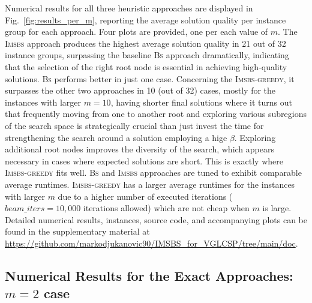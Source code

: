 \documentclass[runningheads]{llncs}
\begin{document}
  
  Numerical results for all three heuristic approaches are displayed in Fig.~\ref{fig:results_per_m}, reporting the average solution quality per instance group for each approach. Four plots are provided, one per each value of $m$. %
   The \textsc{Imsbs} approach produces the highest average solution quality in 21 out of 32 instance groups, surpassing the baseline \textsc{Bs} approach dramatically, indicating that the selection of the right root node is essential in achieving high-quality solutions.   \textsc{Bs} performs better in just one case. Concerning the \textsc{Imsbs-greedy}, it surpasses the other two approaches in 10 (out of 32) cases, mostly for the instances with larger $m=10$, having shorter final solutions where it turns out that frequently moving from one to another root and exploring various subregions of the search space is strategically crucial than just invest the time for strengthening the search around a solution employing a hige $\beta$.  Exploring additional root nodes improves the diversity of the search, which appears necessary in cases where expected solutions are short. This is exactly where  \textsc{Imsbs-greedy} fits well. 
\textsc{Bs} and \textsc{Imsbs} approaches are tuned to exhibit comparable average runtimes.  \textsc{Imsbs-greedy} has a larger average runtimes for the instances with larger $m$ due to a higher number of executed iterations ($beam\_iters = 10,000$ iterations allowed) which are not cheap when $m$ is large. Detailed numerical results, instances, source code, and  accompanying plots can be found in the supplementary material at  \url{https://github.com/markodjukanovic90/IMSBS_for_VGLCSP/tree/main/doc}.  %

\subsection{Numerical Results for the Exact Approaches: $m=2$ case}
\end{document}
